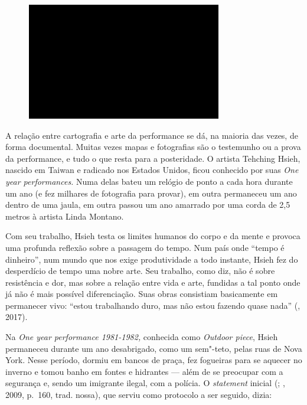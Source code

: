 \begin{figure}[!ht]
\centering
 \includegraphics[width=85mm]{./imgs/im1.jpg}
\caption{\tiny{}}
\end{figure}

A relação entre cartografia e arte da performance se dá, na maioria
das vezes, de forma documental. Muitas vezes mapas e fotografias são o
testemunho ou a prova da performance, e tudo o que resta para a
posteridade. O artista Tehching Hsieh, nascido em Taiwan e radicado nos
Estados Unidos, ficou conhecido por suas \emph{One year performances.}
Numa delas bateu um relógio de ponto a cada hora durante um ano (e fez
milhares de fotografia para provar), em outra permaneceu um ano dentro
de uma jaula, em outra passou um ano amarrado por uma corda de 2,5
metros à artista Linda Montano.

Com seu trabalho, Hsieh testa os limites humanos do corpo e da mente e
provoca uma profunda reflexão sobre a passagem do tempo. Num país onde
``tempo é dinheiro'', num mundo que nos exige produtividade a todo
instante, Hsieh fez do desperdício de tempo uma nobre arte. Seu
trabalho, como diz, não é sobre resistência e dor, mas sobre a relação
entre vida e arte, fundidas a tal ponto onde já não é mais possível
diferenciação. Suas obras consistiam basicamente em permanecer vivo:
``estou trabalhando duro, mas não estou fazendo quase nada'' (,
2017).

Na \emph{One year performance 1981-1982,} conhecida como \emph{Outdoor
piece}, Hsieh permaneceu durante um ano desabrigado, como um sem"-teto,
pelas ruas de Nova York. Nesse período, dormiu em bancos de praça, fez
fogueiras para se aquecer no inverno e tomou banho em fontes e hidrantes
--- além de se preocupar com a segurança e, sendo um imigrante ilegal,
com a polícia. O \emph{statement} inicial (; , 2009, p.~160, trad. nossa), que serviu como protocolo a ser seguido, dizia:

